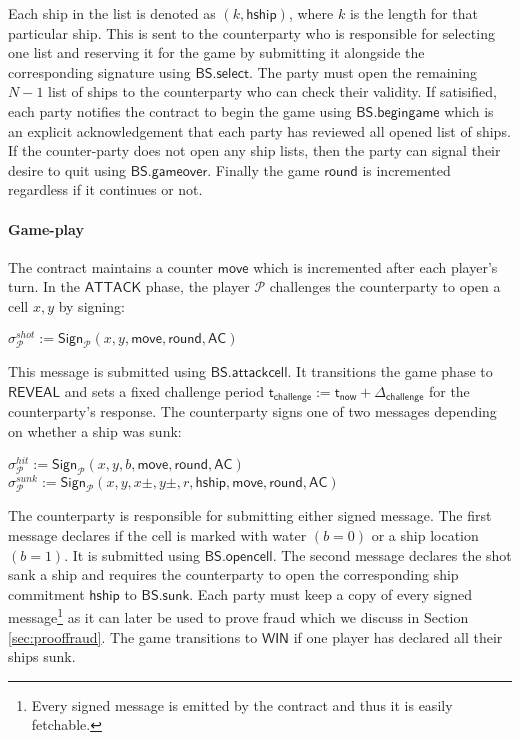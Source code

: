 \documentclass{llncs}
\newcommand{\gameattack}{\mathsf{ATTACK}}
\newcommand{\gamereveal}{\mathsf{REVEAL}}
\newcommand{\gamewinner}{\mathsf{WIN}}
\newcommand{\hship}{\mathsf{hship}}
\newcommand{\participant}{\mathcal{P}}
\newcommand{\sign}{\mathsf{Sign}}
\newcommand{\battleshipattackcell}{\mathsf{BS.attackcell}}
\newcommand{\battleshipbegin}{\mathsf{BS.begingame}}
\newcommand{\battleshipselectboard}{\mathsf{BS.select}}
\newcommand{\battleshiprevealcell}{\mathsf{BS.opencell}}
\newcommand{\battleshipsinking}{\mathsf{BS.sunk}}
\newcommand{\battleshipgameover}{\mathsf{BS.gameover}}
\newcommand{\appcontract}{\mathsf{AC}}
\newcommand{\timerchallenge}{\mathsf{\Delta}_{\mathsf{challenge}}}
\newcommand{\timechallenge}{\mathsf{t}_{\mathsf{challenge}}}
\newcommand{\timenow}{\mathsf{t}_{\mathsf{now}}}
\begin{document}
Each ship in the list is denoted as $(k,\hship)$, where $k$ is the length for that particular ship.  
This is sent to the counterparty who is responsible for selecting one list and reserving it for the game by submitting it alongside the corresponding signature using $\battleshipselectboard$. 
The party must open the remaining $N-1$ list of ships to the counterparty who can check their validity. 
If satisified, each party notifies the contract to begin the game using $\battleshipbegin$ which is an explicit acknowledgement that each party has reviewed all opened list of ships.
If the counter-party does not open any ship lists, then the party can signal their desire to quit  using $\battleshipgameover$.
Finally the game $\mathsf{round}$ is incremented regardless if it continues or not. 

\paragraph{Game-play} \label{sec:gameplayships}
The contract maintains a counter $\mathsf{move}$ which is incremented after each player's turn. 
In the $\gameattack$ phase, the player $\participant$ challenges the counterparty to open a cell $x,y$ by signing: 

\begin{center}
	$\sigma^{shot}_{\participant} := \sign_{\participant}(x,y, \mathsf{move}, \mathsf{round},\appcontract)$ \\
\end{center}

This message is submitted using $\battleshipattackcell$.
It transitions the game phase to $\gamereveal$ and sets a fixed challenge period $\timechallenge := \timenow + \timerchallenge$ for the counterparty's response. 
The counterparty signs one of two messages depending on whether a ship was sunk:

\begin{center}
	$\sigma^{hit}_{\participant} := \sign_{\participant}(x,y,b,\mathsf{move}, \mathsf{round},\appcontract)$ \\ $\sigma^{sunk}_{\participant} := \sign_{\participant}(x,y,x\pm,y\pm,r,\hship,\mathsf{move}, \mathsf{round},\appcontract)$
\end{center}

The counterparty is responsible for submitting either signed message. 
The first message declares if the cell is marked with water $(b=0)$ or a ship location $(b=1)$.
It is submitted using $\battleshiprevealcell$.
The second message declares the shot sank a ship and requires the counterparty to open the corresponding ship commitment $\hship$ to $\battleshipsinking$. 
Each party must keep a copy of every signed message\footnote{Every signed message is emitted by the contract and thus it is easily fetchable.} as it can later be used to prove fraud which we discuss in Section \ref{sec:prooffraud}.
The game transitions to $\gamewinner$ if one player has declared all their ships sunk. 
\end{document}
